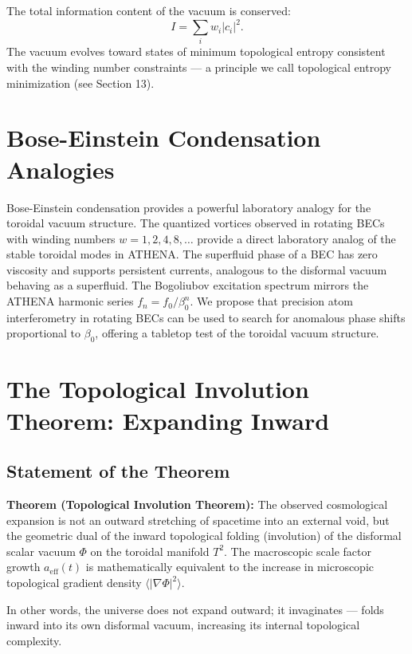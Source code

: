 \documentclass[11pt,a4paper]{article}
\begin{document}
The total information content of the vacuum is conserved:
\begin{equation}
I = \sum_{i}w_{i}|c_{i}|^{2}. \tag{49}
\end{equation}
The vacuum evolves toward states of minimum topological entropy consistent with the winding number constraints — a principle we call topological entropy minimization (see Section 13).

\section{Bose-Einstein Condensation Analogies}
Bose-Einstein condensation provides a powerful laboratory analogy for the toroidal vacuum structure. The quantized vortices observed in rotating BECs with winding numbers \(w = 1,2,4,8,\ldots\) provide a direct laboratory analog of the stable toroidal modes in ATHENA. The superfluid phase of a BEC has zero viscosity and supports persistent currents, analogous to the disformal vacuum behaving as a superfluid. The Bogoliubov excitation spectrum mirrors the ATHENA harmonic series \(f_{n} = f_{0} / \beta_{0}^{n}\). We propose that precision atom interferometry in rotating BECs can be used to search for anomalous phase shifts proportional to \(\beta_{0}\), offering a tabletop test of the toroidal vacuum structure.

\section{The Topological Involution Theorem: Expanding Inward}

\subsection{Statement of the Theorem}
\textbf{Theorem (Topological Involution Theorem):} The observed cosmological expansion is not an outward stretching of spacetime into an external void, but the geometric dual of the inward topological folding (involution) of the disformal scalar vacuum \(\Phi\) on the toroidal manifold \(T^2\). The macroscopic scale factor growth \(a_{\mathrm{eff}}(t)\) is mathematically equivalent to the increase in microscopic topological gradient density \(\langle |\nabla \Phi |^2\rangle\).

In other words, the universe does not expand outward; it invaginates — folds inward into its own disformal vacuum, increasing its internal topological complexity.
\end{document}
